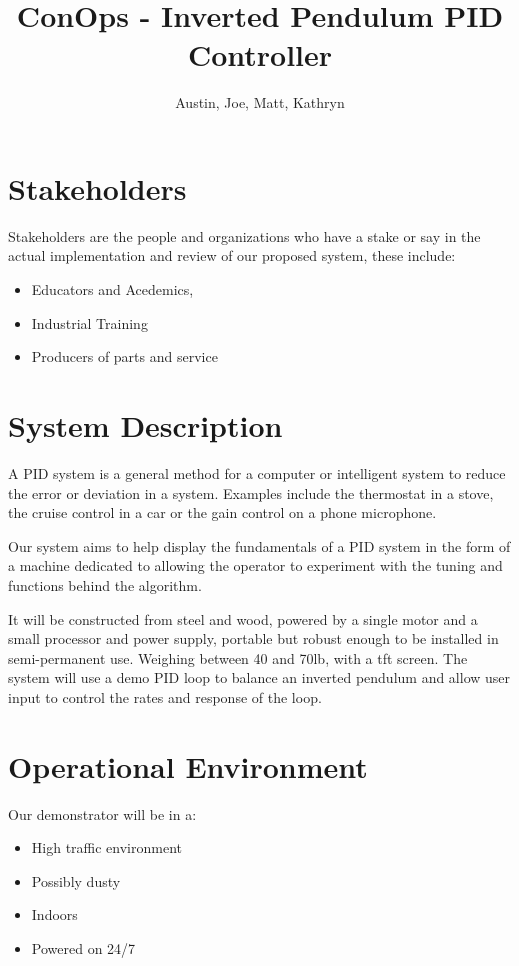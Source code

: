 \documentclass{article}
\title{ConOps - Inverted Pendulum PID Controller}       %
\author{Austin, Joe, Matt, Kathryn}                     %
\begin{document}
\maketitle %


\section{Stakeholders}

Stakeholders are the people and organizations who have a stake or say in the actual
implementation and review of our proposed system, these include:

\begin{itemize}
    \item Educators and Acedemics,
    \item Industrial Training
    \item Producers of parts and service
\end{itemize}


\section{System Description}

A PID system is a general method for a computer or intelligent system to reduce the error
or deviation in a system. Examples include the thermostat in a stove, the cruise control in a
car or the gain control on a phone microphone.

Our system aims to help display the fundamentals of a PID system in the form of a machine dedicated
to allowing the operator to experiment with the tuning and functions behind the algorithm.

It will be constructed from steel and wood, powered by a single motor and a small processor
and power supply, portable but robust enough to be installed in semi-permanent use.
Weighing between 40 and 70lb, with a tft screen. The system will use a demo PID loop to
balance an inverted pendulum and allow user input to control the rates and response of the loop.


\section{Operational Environment}

    Our demonstrator will be in a:
    \begin{itemize}
        \item High traffic environment
        \item Possibly dusty
        \item Indoors
        \item Powered on 24/7
    \end{itemize}
\end{document}
